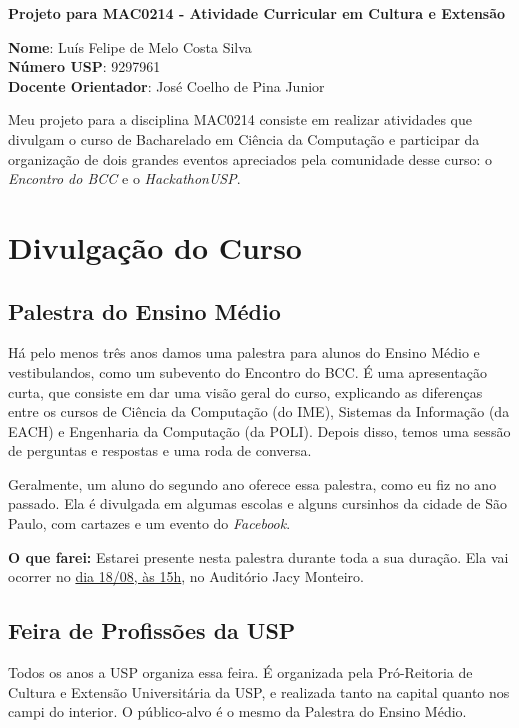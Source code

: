 \documentclass[12pt,letterpaper]{article}
\begin{document}
	
	\begin{center}
		\LARGE \bf
		Projeto para MAC0214 - Atividade Curricular em Cultura e Extensão
	\end{center}
	
	\large \textbf{Nome}: Luís Felipe de Melo Costa Silva \\
	\textbf{Número USP}: 9297961 \\
	\large \textbf{Docente Orientador}: José Coelho de Pina Junior
	
	Meu projeto para a disciplina MAC0214 consiste em realizar atividades que divulgam o curso de Bacharelado em Ciência da Computação e participar da organização de dois grandes eventos apreciados pela comunidade desse curso: o \textit{Encontro do BCC} e o \textit{HackathonUSP}.
	
	\section{Divulgação do Curso}
	
	\subsection{Palestra do Ensino Médio}
	
	Há pelo menos três anos damos uma palestra para alunos do Ensino Médio e vestibulandos, como um subevento do Encontro do BCC. É uma apresentação curta, que consiste em dar uma visão geral do curso, explicando as diferenças entre os cursos de Ciência da Computação (do IME), Sistemas da Informação (da EACH) e Engenharia da Computação (da POLI). Depois disso, temos uma sessão de perguntas e respostas e uma roda de conversa. 
	
	Geralmente, um aluno do segundo ano oferece essa palestra, como eu fiz no ano passado. Ela é divulgada em algumas escolas e alguns cursinhos da cidade de São Paulo, com cartazes e um evento do \textit{Facebook}.
	
	\textbf{O que farei:} Estarei presente nesta palestra durante toda a sua duração. Ela vai ocorrer no \underline{dia 18/08, às 15h}, no Auditório Jacy Monteiro.
	
	\subsection{Feira de Profissões da USP}
	
	Todos os anos a USP organiza essa feira. É organizada pela Pró-Reitoria de Cultura e Extensão Universitária da USP, e realizada tanto na capital quanto nos campi do interior. O público-alvo é o mesmo da Palestra do Ensino Médio.
	
\end{document}
